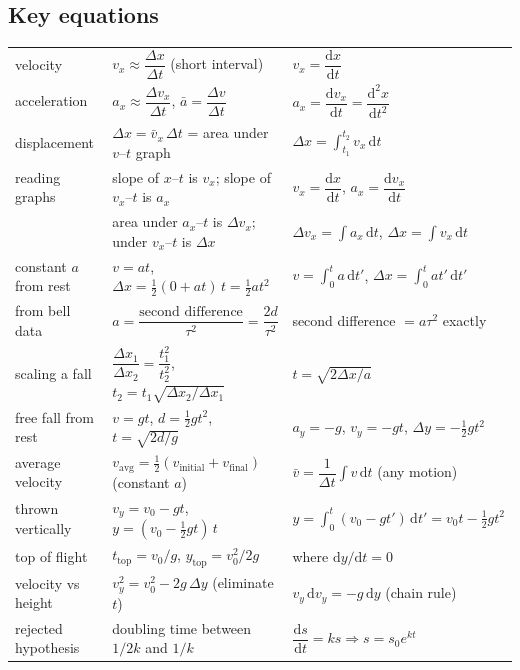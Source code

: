 \documentclass[11pt,twoside,openany]{book}
\newcommand{\dd}{\mathrm{d}}
\newcommand{\viewtag}[3]{\fcolorbox{#2}{#3}{\footnotesize\textbf{\textcolor{#2}{#1}}}}
\newcommand{\elemtag}{\viewtag{Elementary}{elemcol}{elempale}}
\newcommand{\calctag}{\viewtag{Calculus}{calccol}{calcpale}}
\begin{document}
\subsection*{Key equations}
\begin{center}
\renewcommand{\arraystretch}{2.4}
\small
\begin{tabular}{lll}
\toprule
 & \elemtag & \calctag \\
\midrule
velocity & $v_x \approx \dfrac{\Delta x}{\Delta t}$ (short interval) & $v_x = \dfrac{\dd x}{\dd t}$ \\
acceleration & $a_x \approx \dfrac{\Delta v_x}{\Delta t}$, \quad $\bar a = \dfrac{\Delta v}{\Delta t}$ & $a_x = \dfrac{\dd v_x}{\dd t} = \dfrac{\dd^2 x}{\dd t^2}$ \\
displacement & $\Delta x = \bar v_x\,\Delta t$ = area under $v$--$t$ graph & $\Delta x = \displaystyle\int_{t_1}^{t_2} v_x\,\dd t$ \\
reading graphs & slope of $x$--$t$ is $v_x$; slope of $v_x$--$t$ is $a_x$ & $v_x = \dfrac{\dd x}{\dd t}$, \quad $a_x = \dfrac{\dd v_x}{\dd t}$ \\
 & area under $a_x$--$t$ is $\Delta v_x$; under $v_x$--$t$ is $\Delta x$ & $\Delta v_x = \displaystyle\int a_x\,\dd t$, \quad $\Delta x = \displaystyle\int v_x\,\dd t$ \\
constant $a$ from rest & $v = at$, \quad $\Delta x = \tfrac12(0 + at)\,t = \tfrac12 a t^2$ & $v = \displaystyle\int_0^t a\,\dd t'$, \quad $\Delta x = \displaystyle\int_0^t at'\,\dd t'$ \\
from bell data & $a = \dfrac{\text{second difference}}{\tau^2} = \dfrac{2d}{\tau^2}$ & second difference $= a\tau^2$ exactly \\
scaling a fall & $\dfrac{\Delta x_1}{\Delta x_2} = \dfrac{t_1^2}{t_2^2}$, \quad $t_2 = t_1\sqrt{\Delta x_2/\Delta x_1}$ & $t = \sqrt{2\Delta x/a}$ \\
free fall from rest & $v = gt$, \quad $d = \tfrac12 g t^2$, \quad $t = \sqrt{2d/g}$ & $a_y = -g$, \; $v_y = -gt$, \; $\Delta y = -\tfrac12 g t^2$ \\
average velocity & $v_{\text{avg}} = \tfrac12(v_{\text{initial}} + v_{\text{final}})$ (constant $a$) & $\bar v = \dfrac{1}{\Delta t}\displaystyle\int v\,\dd t$ (any motion) \\
thrown vertically & $v_y = v_0 - gt$, \quad $y = (v_0 - \tfrac12 gt)\,t$ & $y = \displaystyle\int_0^t (v_0 - gt')\,\dd t' = v_0 t - \tfrac12 g t^2$ \\
top of flight & $t_{\text{top}} = v_0/g$, \quad $y_{\text{top}} = v_0^2/2g$ & where $\dd y/\dd t = 0$ \\
velocity vs height & $v_y^2 = v_0^2 - 2g\,\Delta y$ (eliminate $t$) & $v_y\,\dd v_y = -g\,\dd y$ (chain rule) \\
rejected hypothesis & doubling time between $1/2k$ and $1/k$ & $\dfrac{\dd s}{\dd t} = ks \Rightarrow s = s_0 e^{kt}$ \\
\bottomrule
\end{tabular}
\end{center}
\end{document}
